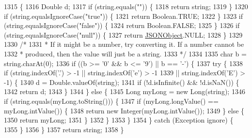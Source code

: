 \begin{DoxyCode}
1315                                                       \{
1316         Double d;
1317         \textcolor{keywordflow}{if} (\textcolor{keywordtype}{string}.equals(\textcolor{stringliteral}{""})) \{
1318             \textcolor{keywordflow}{return} string;
1319         \}
1320         \textcolor{keywordflow}{if} (\textcolor{keywordtype}{string}.equalsIgnoreCase(\textcolor{stringliteral}{"true"})) \{
1321             \textcolor{keywordflow}{return} Boolean.TRUE;
1322         \}
1323         \textcolor{keywordflow}{if} (\textcolor{keywordtype}{string}.equalsIgnoreCase(\textcolor{stringliteral}{"false"})) \{
1324             \textcolor{keywordflow}{return} Boolean.FALSE;
1325         \}
1326         \textcolor{keywordflow}{if} (\textcolor{keywordtype}{string}.equalsIgnoreCase(\textcolor{stringliteral}{"null"})) \{
1327             \textcolor{keywordflow}{return} \hyperlink{classorg_1_1json_1_1_j_s_o_n_object_a7c17e59daff74ce50c6677c6f5da233d}{JSONObject}.NULL;
1328         \}
1329 
1330         \textcolor{comment}{/*}
1331 \textcolor{comment}{         * If it might be a number, try converting it. If a number cannot be}
1332 \textcolor{comment}{         * produced, then the value will just be a string.}
1333 \textcolor{comment}{         */}
1334 
1335         \textcolor{keywordtype}{char} b = \textcolor{keywordtype}{string}.charAt(0);
1336         \textcolor{keywordflow}{if} ((b >= \textcolor{charliteral}{'0'} && b <= \textcolor{charliteral}{'9'}) || b == \textcolor{charliteral}{'-'}) \{
1337             \textcolor{keywordflow}{try} \{
1338                 \textcolor{keywordflow}{if} (\textcolor{keywordtype}{string}.indexOf(\textcolor{charliteral}{'.'}) > -1 || \textcolor{keywordtype}{string}.indexOf(\textcolor{charliteral}{'e'}) > -1
1339                         || \textcolor{keywordtype}{string}.indexOf(\textcolor{charliteral}{'E'}) > -1) \{
1340                     d = Double.valueOf(\textcolor{keywordtype}{string});
1341                     \textcolor{keywordflow}{if} (!d.isInfinite() && !d.isNaN()) \{
1342                         \textcolor{keywordflow}{return} d;
1343                     \}
1344                 \} \textcolor{keywordflow}{else} \{
1345                     Long myLong = \textcolor{keyword}{new} Long(\textcolor{keywordtype}{string});
1346                     \textcolor{keywordflow}{if} (\textcolor{keywordtype}{string}.equals(myLong.toString())) \{
1347                         \textcolor{keywordflow}{if} (myLong.longValue() == myLong.intValue()) \{
1348                             \textcolor{keywordflow}{return} \textcolor{keyword}{new} Integer(myLong.intValue());
1349                         \} \textcolor{keywordflow}{else} \{
1350                             \textcolor{keywordflow}{return} myLong;
1351                         \}
1352                     \}
1353                 \}
1354             \} \textcolor{keywordflow}{catch} (Exception ignore) \{
1355             \}
1356         \}
1357         \textcolor{keywordflow}{return} string;
1358     \}
\end{DoxyCode}
